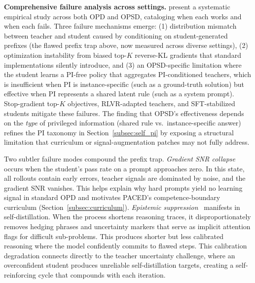 \documentclass{article} %
\begin{document}
\textbf{Comprehensive failure analysis across settings.} \citet{2605.11182} present a systematic empirical study across both OPD and OPSD, cataloging when each works and when each fails. Three failure mechanisms emerge: (1) distribution mismatch between teacher and student caused by conditioning on student-generated prefixes (the flawed prefix trap above, now measured across diverse settings), (2) optimization instability from biased top-$K$ reverse-KL gradients that standard implementations silently introduce, and (3) an OPSD-specific limitation where the student learns a PI-free policy that aggregates PI-conditioned teachers, which is insufficient when PI is instance-specific (such as a ground-truth solution) but effective when PI represents a shared latent rule (such as a system prompt). Stop-gradient top-$K$ objectives, RLVR-adapted teachers, and SFT-stabilized students mitigate these failures. The finding that OPSD's effectiveness depends on the \emph{type} of privileged information (shared rule vs.\ instance-specific answer) refines the PI taxonomy in Section~\ref{subsec:self_pi} by exposing a structural limitation that curriculum or signal-augmentation patches may not fully address.

Two subtler failure modes compound the prefix trap. \emph{Gradient SNR collapse} occurs when the student's pass rate on a prompt approaches zero. In this state, all rollouts contain early errors, teacher signals are dominated by noise, and the gradient SNR vanishes. This helps explain why hard prompts yield no learning signal in standard OPD and motivates PACED's competence-boundary curriculum (Section~\ref{subsec:curriculum}). \emph{Epistemic suppression}~\citep{2603.24472} manifests in self-distillation. When the process shortens reasoning traces, it disproportionately removes hedging phrases and uncertainty markers that serve as implicit attention flags for difficult sub-problems. This produces shorter but less calibrated reasoning where the model confidently commits to flawed steps. This calibration degradation connects directly to the teacher uncertainty challenge, where an overconfident student produces unreliable self-distillation targets, creating a self-reinforcing cycle that compounds with each iteration.
\end{document}
